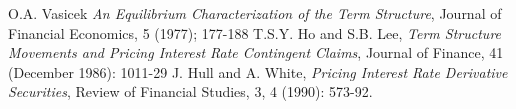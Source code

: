 %

\newpage
\begin{thebibliography}{9}
O.A. Vasicek \emph{An Equilibrium Characterization of the Term Structure},
Journal of Financial Economics, 5 (1977); 177-188
T.S.Y. Ho and S.B. Lee, \emph{Term Structure Movements and Pricing Interest
Rate Contingent Claims}, Journal of Finance, 41 (December 1986): 1011-29
J. Hull and A. White, \emph{Pricing Interest Rate Derivative Securities}, Review of Financial Studies, 3, 4 (1990): 573-92.
\end{thebibliography}

    
